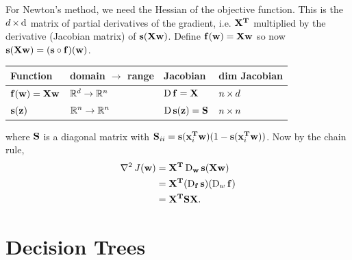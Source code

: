 \documentclass[12pt]{article}
\begin{document}
For Newton's method, we need the Hessian of the objective function. This is the
$d \by \d$ matrix of partial derivatives of the gradient, i.e. $\X^\T$
multiplied by the derivative (Jacobian matrix) of $\s(\X\w)$. Define
$\f(\w) = \X\w$ so now $\s(\X\w) = (\s \circ \f)(\w)$.

\begin{tabular}{l | l | l | l}
  Function         & domain $\to$ range    & Jacobian                               & dim Jacobian \\
  \hline
  $\f(\w) = \X\w$  &$\R^d \rightarrow \R^n$ &$\D\f = \X$                            & $n \by d$\\
  $\s(\z)$         &$\R^n \rightarrow \R^n$ &$\D\s(\z) = \S$ & $n \by n$
\end{tabular}

where $\S$ is a diagonal matrix with
$\S_{ii} = \s(\x_i^\T\w)(1 - \s(\x_i^\T\w))$. Now by the chain rule,
\begin{align*}
\hess J(\w) &= \X^\T \D_\w \s(\X\w) \\
            &= \X^\T (\D_\f \s) (\D_w \f) \\
            &= \X^\T\S\X.
\end{align*}



\section*{Decision Trees}
\end{document}
